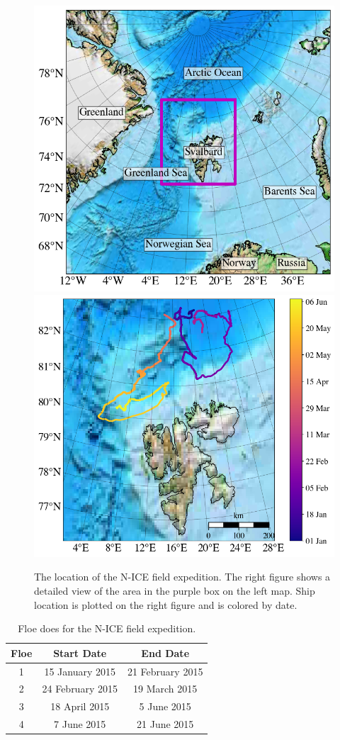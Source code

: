 \begin{figure}[H]
    \centering
    \includegraphics[width=0.5\linewidth]{figures/chapter2/ship_zoom_out.png}\includegraphics[width=0.55\linewidth]{figures/chapter2/ship_zoom_in.png}
    \caption[N-ICE location.]{The location of the N-ICE field expedition. The right figure shows a detailed view of the area in the purple box on the left map. Ship location is plotted on the right figure and is colored by date.}
    \label{fig:nice}
\end{figure}


\begin{table}[H]
\centering
\footnotesize
{
\begin{tabular}{| c | c | c |}
 \hline
\rowcolor[HTML]{F3F3F3} \textbf{Floe} & \textbf{Start Date} & \textbf{End Date} \\
  \hline
 1 & 15 January 2015 & 21 February 2015 \\
 2 & 24 February 2015 & 19 March 2015 \\ 
 3 & 18 April 2015 & 5 June 2015\\
 4 & 7 June 2015 & 21 June 2015 \\
  \hline
\end{tabular}}
\caption{Floe does for the N-ICE field expedition.}
\label{tab:floedates}
\end{table}




